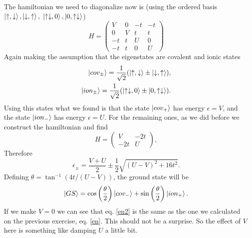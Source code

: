 \begin{questions}
\begin{solution}
The hamiltonian we need to diagonalize now is (using the ordered basis $\ket{\uparrow,\downarrow},\ket{\downarrow,\uparrow},$ $ \ket{\uparrow \downarrow,0 }, \ket{0, \uparrow \downarrow}$)
\begin{equation}
  H = \begin{pmatrix}
    V & 0 & -t & -t \\
    0 & V & t & t \\
    -t & t & U & 0 \\
    -t & t & 0 & U
\end{pmatrix}
\end{equation}
Again making the assumption that the eigenstates are covalent and ionic states
\begin{eqnarray}
  \ket{cov_\pm} = \frac{1}{\sqrt{2}}(\ket{\uparrow,\downarrow} \pm \ket{\downarrow, \uparrow}),\\
  \ket{ion_\pm} = \frac{1}{\sqrt{2}}(\ket{\uparrow \downarrow,0} \pm \ket{0, \uparrow \downarrow}).
\end{eqnarray}
Using this states what we found is that the state $\ket{cov_+}$ has energy $\epsilon = V$, and the state $\ket{ion_-}$ has energy $\epsilon=U$.
For the remaining ones, as we did before we construct the hamiltonian and find
\begin{equation}
  H = \begin{pmatrix}
    V & -2t \\
    -2t & U
\end{pmatrix},
\end{equation}
Therefore
\begin{equation}
  \epsilon_\pm = \frac{V+U}{2} \pm \frac{1}{2} \sqrt{(U-V)^2 + 16t^2}.
  \label{en2}
\end{equation}
Defining $\theta  = \tan^{-1} (4t/(U-V))$, the ground state will be
\begin{equation}
  \ket{GS} = \cos \left(\frac{\theta}{2}\right) \ket{cov_-} + \sin \left(\frac{\theta}{2}\right) \ket{ion_+}.
\end{equation}
If we make $V=0$ we can see that eq. \ref{en2} is the same as the one we calculated on the previous exercise, eq. \ref{en}. This should not be a surprise. So the effect of $V$ here is something like damping $U$ a little bit.
\end{solution}
\end{questions}
